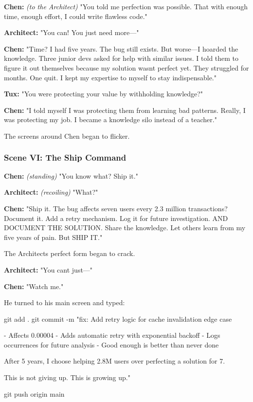 \textbf{Chen:} \emph{(to the Architect)} "You told me perfection was possible. That with enough time, enough effort, I could write flawless code."

\textbf{Architect:} "You can! You just need more---"

\textbf{Chen:} "Time? I had five years. The bug still exists. But worse---I hoarded the knowledge. Three junior devs asked for help with similar issues. I told them to \textquotesingle figure it out themselves\textquotesingle{} because my solution wasn\textquotesingle t perfect yet. They struggled for months. One quit. I kept my \textquotesingle expertise\textquotesingle{} to myself to stay indispensable."

\textbf{Tux:} "You were protecting your value by withholding knowledge?"

\textbf{Chen:} "I told myself I was protecting them from learning bad patterns. Really, I was protecting my job. I became a knowledge silo instead of a teacher."

The screens around Chen began to flicker.

\bookdivider

\subsubsection{Scene VI: The Ship Command}\label{scene-vi-the-ship-command}

\textbf{Chen:} \emph{(standing)} "You know what? Ship it."

\textbf{Architect:} \emph{(recoiling)} "What?"

\textbf{Chen:} "Ship it. The bug affects seven users every 2.3 million transactions? Document it. Add a retry mechanism. Log it for future investigation. AND DOCUMENT THE SOLUTION. Share the knowledge. Let others learn from my five years of pain. But SHIP IT."

The Architect\textquotesingle s perfect form began to crack.

\textbf{Architect:} "You can\textquotesingle t just---"

\textbf{Chen:} "Watch me."

He turned to his main screen and typed:

\begin{codeblock}
git add .
git commit -m "fix: Add retry logic for cache invalidation edge case

- Affects 0.00004%
- Adds automatic retry with exponential backoff  
- Logs occurrences for future analysis
- Good enough is better than never done

After 5 years, I choose helping 2.8M users over
perfecting a solution for 7.

This is not giving up. This is growing up."

git push origin main
\end{codeblock}

